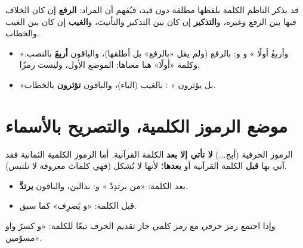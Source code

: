 \begin{mufradat}
\end{mufradat}
\maana قد يذكر الناظم الكلمة بلفظها مطلقة دون قيد، فيُفهم أن المراد: \textbf{الرفع} إن كان الخلاف فيها بين الرفع وغيره، و\textbf{التذكير} إن كان بين التذكير والتأنيث، و\textbf{الغيب} إن كان بين الغيب والخطاب.
\begin{amthila}
\begin{itemize}
\item «وأربعُ أولًا » \ila{} \Hamza{} و\Kisai{} و\Hafs:   بالرفع (ولم يقل «بالرفع» بل أطلقها)، والباقون \textbf{أربعَ} بالنصب. وكلمة «أولًا» هنا معناها: الموضع الأول، وليست رمزًا.
\item «بل يؤثرون » \ila{} \AbuAmr:   بالغيب (الياء)، والباقون \textbf{تؤثرون} بالخطاب.
\end{itemize}
\end{amthila}

\section{موضع الرموز الكلمية، والتصريح بالأسماء}

\begin{mufradat}
\end{mufradat}
\maana الرموز الحرفية (أبج...) \textbf{لا تأتي إلا بعد} الكلمة القرآنية. أما الرموز الكلمية الثمانية فقد آتي بها \textbf{قبل} الكلمة القرآنية أو \textbf{بعدها}؛ لأنها لا تُشكل (فهي كلمات معروفة لا تلتبس).
\begin{amthila}
\begin{itemize}
\item بعد الكلمة: «من يرتدِدْ » \ila{} \Nafi{} و\IbnAmir:   بدالين، والباقون \textbf{يرتدَّ}.
\item قبل الكلمة: «و يَصرِف» كما سبق.
\end{itemize}
وإذا اجتمع رمز حرفي مع رمز كلمي جاز تقديم الحرف تبعًا للكلمة: «و  كسرُ واو مسوّمين».
\end{amthila}

